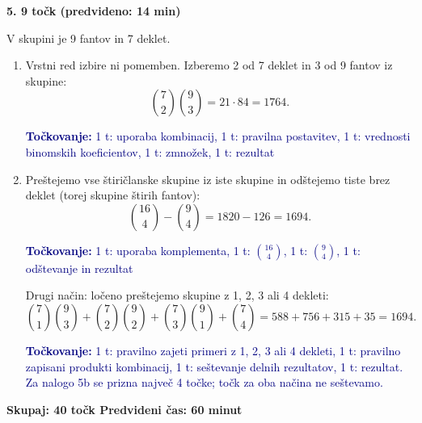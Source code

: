\documentclass[11pt,a4paper]{article}
\newenvironment{taskbox}[1]{%
    \par\addvspace{24pt}%
    \noindent\textbf{\large #1}\par
}{\par\addvspace{16pt}}
\newcommand{\rubric}[1]{%
    \par\smallskip\noindent
    {\small\textcolor{navy}{\textbf{Točkovanje:} #1}}%
    \par\smallskip}
\begin{document}
\begin{taskbox}{5. \hfill 9 točk \quad (predvideno: 14 min)}
V skupini je 9 fantov in 7 deklet.
\begin{enumerate}[label=\alph*)]
    \item Vrstni red izbire ni pomemben. Izberemo 2 od 7 deklet in 3 od 9
    fantov iz skupine:
    \[
        \binom{7}{2}\binom{9}{3}=21\cdot84=\boxed{1764}.
    \]
    \rubric{1 t: uporaba kombinacij, 1 t: pravilna postavitev, 1 t: vrednosti
    binomskih koeficientov, 1 t: zmnožek, 1 t: rezultat}
    \item Preštejemo vse štiričlanske skupine iz iste skupine in odštejemo
    tiste brez deklet (torej skupine štirih fantov):
    \[
        \binom{16}{4}-\binom{9}{4}
        =1820-126
        =\boxed{1694}.
    \]
    \rubric{1 t: uporaba komplementa, 1 t: \(\binom{16}{4}\), 1 t:
    \(\binom{9}{4}\), 1 t: odštevanje in rezultat}

    Drugi način: ločeno preštejemo skupine z 1, 2, 3 ali 4 dekleti:
    \[
        \binom{7}{1}\binom{9}{3}
        +\binom{7}{2}\binom{9}{2}
        +\binom{7}{3}\binom{9}{1}
        +\binom{7}{4}
        =588+756+315+35
        =\boxed{1694}.
    \]
    \rubric{1 t: pravilno zajeti primeri z 1, 2, 3 ali 4 dekleti, 1 t: pravilno
    zapisani produkti kombinacij, 1 t: seštevanje delnih rezultatov,
    1 t: rezultat. Za nalogo 5b se prizna največ 4 točke; točk za oba načina
    ne seštevamo.}
\end{enumerate}
\end{taskbox}

\begin{center}
    \textbf{Skupaj: 40 točk \qquad Predvideni čas: 60 minut}
\end{center}
\end{document}

